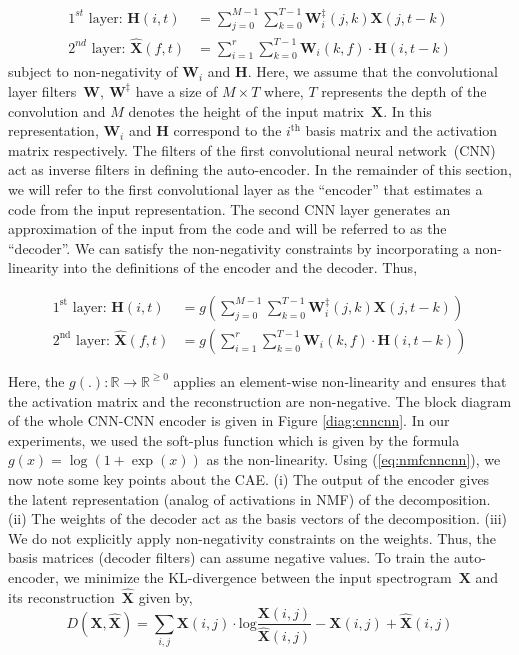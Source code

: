 \documentclass{article}
\begin{document}
\begin{align}
  \text{$1^{st}$ layer:~}\mathbf{H}(i,t) &= \sum_{j=0}^{M-1} \sum_{k=0}^{T-1} \mathbf{W}_{i}^{\ddagger}(j,k)\mathbf{X}(j,t-k) \nonumber \\
  \text{$2^{nd}$ layer:~}\hat{\mathbf{X}}(f,t) &= \sum_{i=1}^{r} \sum_{k=0}^{T-1} \mathbf{W}_{i}(k,f)\cdot\mathbf{H}(i,t-k)
    \label{eq:nmfcnncnn}
\end{align}
subject to non-negativity of $\mathbf{W}_{i}$ and $\mathbf{H}$. Here, we assume that the convolutional layer filters~$\mathbf{W},~\mathbf{W}^{\ddagger}$ have a size of $M\times T$ where, $T$ represents the depth of the convolution and $M$ denotes the height of the input matrix~$\mathbf{X}$. In this representation, $\mathbf{W}_{i}$ and $\mathbf{H}$ correspond to the $i^{\text{th}}$ basis matrix and the activation matrix respectively. The filters of the first convolutional neural network~(CNN) act as inverse filters in defining the auto-encoder. In the remainder of this section, we will refer to the first convolutional layer as the ``encoder'' that estimates a code from the input representation. The second CNN layer generates an approximation of the input from the code and will be referred to as the ``decoder''. We can satisfy the non-negativity constraints by incorporating a non-linearity into the definitions of the encoder and the decoder. Thus,

\begin{align}
    \text{$1^{\text{st}}$ layer:~}\mathbf{H}(i,t) &= g\left(\sum_{j=0}^{M-1} \sum_{k=0}^{T-1} \mathbf{W}_{i}^{\ddagger}(j,k)\mathbf{X}(j,t-k)\right) \nonumber \\
    \text{$2^{\text{nd}}$ layer:~}\hat{\mathbf{X}}(f,t) &= g\left(\sum_{i=1}^{r} \sum_{k=0}^{T-1} \mathbf{W}_{i}(k,f)\cdot\mathbf{H}(i,t-k)\right)
    \label{eq:nmfcnncnn}
\end{align}

Here, the $g(.):\mathbb{R}\rightarrow \mathbb{R}^{\geq0}$ applies an element-wise non-linearity and ensures that the activation matrix and the reconstruction are non-negative. The block diagram of the whole CNN-CNN encoder is given in Figure \ref{diag:cnncnn}. In our experiments, we used the soft-plus function which is given by the formula $g(x) = \log(1+\exp(x))$ as the non-linearity. Using (\ref{eq:nmfcnncnn}), we now note some key points about the CAE. (i) The output of the encoder gives the latent representation (analog of activations in NMF) of the decomposition. (ii) The weights of the decoder act as the basis vectors of the decomposition. (iii) We do not explicitly apply non-negativity constraints on the weights. Thus, the basis matrices (decoder filters) can assume negative values. To train the auto-encoder, we minimize the KL-divergence between the input spectrogram~$\mathbf{X}$ and its reconstruction~$\hat{\mathbf{X}}$ given by,
\begin{equation*}
    D\left(\mathbf{X},\hat{\mathbf{X}}\right) = \sum_{i,j} \mathbf{X}(i,j)\cdot \text{log}\frac{\mathbf{X}(i,j)}{\hat{\mathbf{X}}(i,j)} - \mathbf{X}(i,j) + \hat{\mathbf{X}}(i,j)
\end{equation*}
\end{document}
